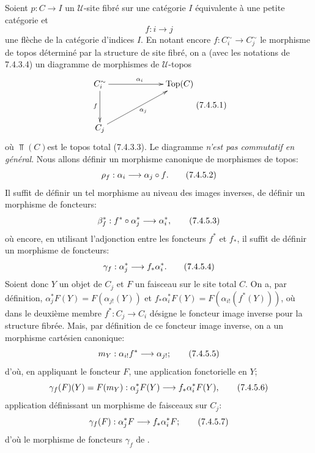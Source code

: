 \documentclass[10pt]{../fichiers-configuration-latex/smfart}
\begin{document}
Soient $p : C \to I$ un $𝒰$-site fibré sur une catégorie $I$
équivalente à une petite catégorie et
$$
f : i \to j
$$
une flèche de la catégorie d'indices $I$. En notant encore $f :
C^{\sim}_i \to C^{\sim}_j$ le morphisme de topos déterminé par la
structure de site fibré, on a (avec les notations de 7.4.3.4)
un diagramme de morphismes de $𝒰$-topos
\[\vcenter{
\xymatrix@C=2.25cm@R=1.25cm{
C^{\sim}_i \ar[d]_{f} \ar[r]^{\alpha_i} & \Top(C)\\
C_j  \ar[ru]_{\alpha_j}&
}}\leqno{(7.4.5.1)}
\]
où $\Top(C)$\pageoriginale est le topos total (7.4.3.3).
Le diagramme 
\emph{n'est pas commutatif en général}. Nous allons définir un
morphisme canonique de morphismes de topos:
\begin{equation*}
\rho_f : \alpha_i \to \alpha_j \circ f{\quoi}.\tag{7.4.5.2}
\end{equation*}
Il suffit de définir un tel morphisme au niveau des images inverses,
\ie de définir un morphisme de foncteurs:
\begin{equation*}
\beta_f^{\ast} : f^{\ast}\circ \alpha_j^{\ast} \to
\alpha_i^{\ast}{\quoi}, \tag{7.4.5.3}
\end{equation*}
où encore, en utilisant l'adjonction entre les foncteurs $f^{\ast}$ et
$f_{\ast}$, il suffit de définir un morphisme de foncteurs:
\begin{equation*}
\gamma_f : \alpha^{\ast}_j \to f_{\ast} \alpha^{\ast}_i{\quoi}.\tag{7.4.5.4}
\end{equation*}
Soient donc $Y$ un objet de $C_j$ et $F$ un faisceau sur le site
total $C$. On a, par définition, $\alpha^{\ast}_j F(Y) =
F(\alpha_{j!} (Y))$ et  $f_{\ast} \alpha^{\ast}_i F(Y) =
F(\alpha_{i!} (f^{\ast} (Y)))$, où dans le deuxième membre
$f^{\ast} : C_j \to C_i$ désigne le foncteur image inverse pour la
structure fibrée. Mais, par définition de ce foncteur image inverse,
on a un morphisme cartésien canonique:
\begin{equation*}
m_Y : \alpha_{i!} f^{\ast} \to \alpha_{j!}{\quoi};\tag{7.4.5.5}
\end{equation*}
d'où, en appliquant le foncteur $F$, une application fonctorielle en $Y$;
\begin{equation*}
\gamma_f (F) (Y) = F(m_Y) : \alpha_{j}^{\ast} F(Y) \to f_{\ast}
\alpha^{\ast}_i F(Y){\quoi},\tag{7.4.5.6}
\end{equation*}
application définissant un morphisme de faisceaux sur $C_j$:
\begin{equation*}
\gamma_f (F) : \alpha_{j}^{\ast} F \to f_{\ast} \alpha^{\ast}_i
F{\quoi};\tag{7.4.5.7}
\end{equation*}
d'où le morphisme de foncteurs $\gamma_f$ de .
\end{document}
